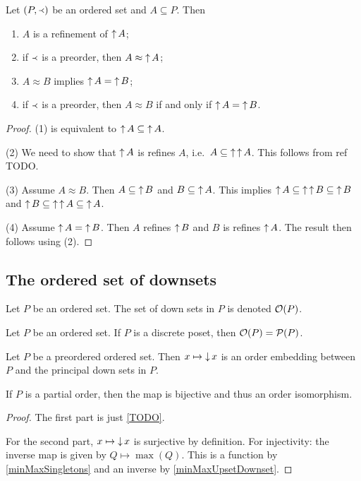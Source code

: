 \begin{lemma}
Let $\left( P,\Yleft \right)$ be an ordered set and $A \subseteq P$. Then
\begin{enumerate}
\item $A$ is a refinement of $\operatorname{\uparrow} A$;
\item if $\Yleft$ is a preorder, then $A \approx \operatorname{\uparrow} A$;
\item $A \approx B$ implies $\operatorname{\uparrow} A = \operatorname{\uparrow} B$;
\item if $\Yleft$ is a preorder, then $A \approx B$ \textup{if and only if} $\operatorname{\uparrow} A = \operatorname{\uparrow} B$.
\end{enumerate}
\end{lemma}
\begin{proof}
(1) is equivalent to $\operatorname{\uparrow} A \subseteq \operatorname{\uparrow} A$.

(2) We need to show that $\operatorname{\uparrow} A$ is refines $A$, i.e.\ $A\subseteq \operatorname{\uparrow}\operatorname{\uparrow} A$. This follows from ref TODO.

(3) Assume $A \approx B$. Then $A \subseteq \operatorname{\uparrow} B$ and $B \subseteq \operatorname{\uparrow} A$. This implies $\operatorname{\uparrow} A \subseteq \operatorname{\uparrow}\operatorname{\uparrow} B \subseteq \operatorname{\uparrow} B$ and $\operatorname{\uparrow} B \subseteq \operatorname{\uparrow}\operatorname{\uparrow} A \subseteq \operatorname{\uparrow} A$.

(4) Assume $\operatorname{\uparrow} A = \operatorname{\uparrow} B$. Then $A$ refines $\operatorname{\uparrow} B$ and $B$ is refines $\operatorname{\uparrow} A$. The result then follows using (2).
\end{proof}

\subsection{The ordered set of downsets}
\begin{definition}
Let $P$ be an ordered set. The set of down sets in $P$ is denoted $\operatorname{\mathcal{O}}(P)$.
\end{definition}

\begin{lemma}
Let $P$ be an ordered set.
If $P$ is a discrete poset, then $\operatorname{\mathcal{O}}(P) = \operatorname{\mathcal{P}}(P)$.
\end{lemma}

\begin{proposition} \label{orderedSetPowerset}
Let $P$ be a preordered ordered set. Then $x\mapsto \operatorname{\downarrow} x$ is an order embedding between $P$ and the principal down sets in $P$.

If $P$ is a partial order, then the map is bijective and thus an order isomorphism.
\end{proposition}
\begin{proof}
The first part is just \ref{TODO}.

For the second part, $x\mapsto \operatorname{\downarrow} x$ is surjective by definition. For injectivity: the inverse map is given by $Q\mapsto \max(Q)$. This is a function by \ref{minMaxSingletons} and an inverse by \ref{minMaxUpsetDownset}.
\end{proof}

